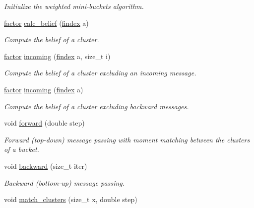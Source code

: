 \begin{DoxyCompactItemize}
\begin{DoxyCompactList}\small\item\em Initialize the weighted mini-\/buckets algorithm. \end{DoxyCompactList}\item 
\hyperlink{classmerlin_1_1factor}{factor} \hyperlink{classmerlin_1_1wmb_a67bd322cf76dd18439123f244c8e95d9}{calc\+\_\+belief} (\hyperlink{classmerlin_1_1wmb_a5b845e1e9c8b169094995a385abb232a}{findex} a)
\begin{DoxyCompactList}\small\item\em Compute the belief of a cluster. \end{DoxyCompactList}\item 
\hyperlink{classmerlin_1_1factor}{factor} \hyperlink{classmerlin_1_1wmb_ad79e4290a7a13c13ba249d764704090a}{incoming} (\hyperlink{classmerlin_1_1wmb_a5b845e1e9c8b169094995a385abb232a}{findex} a, size\+\_\+t i)
\begin{DoxyCompactList}\small\item\em Compute the belief of a cluster excluding an incoming message. \end{DoxyCompactList}\item 
\hyperlink{classmerlin_1_1factor}{factor} \hyperlink{classmerlin_1_1wmb_af49cff26f827f40b710f06f9ebc6e01e}{incoming} (\hyperlink{classmerlin_1_1wmb_a5b845e1e9c8b169094995a385abb232a}{findex} a)
\begin{DoxyCompactList}\small\item\em Compute the belief of a cluster excluding backward messages. \end{DoxyCompactList}\item 
\hypertarget{classmerlin_1_1wmb_ae0751c60569981427b9aea293e7ae6ba}{}void \hyperlink{classmerlin_1_1wmb_ae0751c60569981427b9aea293e7ae6ba}{forward} (double step)\label{classmerlin_1_1wmb_ae0751c60569981427b9aea293e7ae6ba}

\begin{DoxyCompactList}\small\item\em Forward (top-\/down) message passing with moment matching between the clusters of a bucket. \end{DoxyCompactList}\item 
\hypertarget{classmerlin_1_1wmb_af70144800198fa62226da1cc94b8a932}{}void \hyperlink{classmerlin_1_1wmb_af70144800198fa62226da1cc94b8a932}{backward} (size\+\_\+t iter)\label{classmerlin_1_1wmb_af70144800198fa62226da1cc94b8a932}

\begin{DoxyCompactList}\small\item\em Backward (bottom-\/up) message passing. \end{DoxyCompactList}\item 
\hypertarget{classmerlin_1_1wmb_a15f2962a5be2bff5c8778018c8dc785d}{}void \hyperlink{classmerlin_1_1wmb_a15f2962a5be2bff5c8778018c8dc785d}{match\+\_\+clusters} (size\+\_\+t x, double step)\label{classmerlin_1_1wmb_a15f2962a5be2bff5c8778018c8dc785d}


\end{DoxyCompactItemize}
